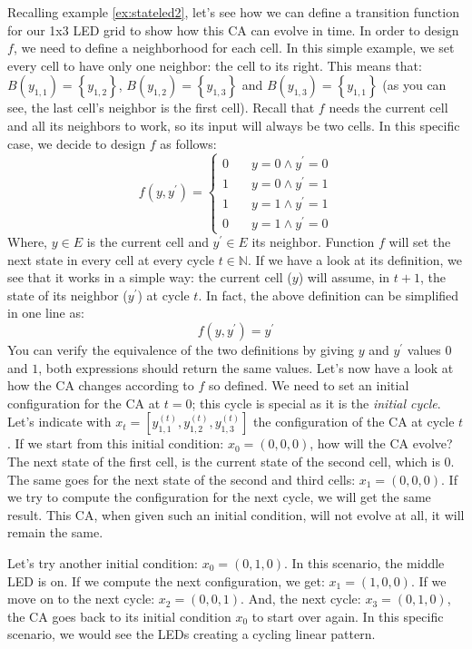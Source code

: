 \begin{example}
\label{ex:stateled3}
Recalling example \ref{ex:stateled2}, let's see how we can define a transition function for our
1x3 LED grid to show how this CA can evolve in time. In order to design $f$, we need to define
a neighborhood for each cell. In this simple example, we set every cell to have only one neighbor:
the cell to its right. This means that: $B\left( y_{1,1} \right) = \left\{ y_{1,2} \right\}$,
$B\left( y_{1,2} \right) = \left\{ y_{1,3} \right\}$ and 
$B\left( y_{1,3} \right) = \left\{ y_{1,1} \right\}$ (as you can see, the last cell's
neighbor is the first cell).
Recall that $f$ needs the current cell
and all its neighbors to work, so its input will always be two cells.
In this specific case, we decide to design $f$ as follows:
\begin{equation*}
f \left( y, y^\prime \right) =
  \begin{cases}
    0       & \quad y = 0 \wedge y^\prime = 0\\
    1       & \quad y = 0 \wedge y^\prime = 1\\
    1       & \quad y = 1 \wedge y^\prime = 1\\
    0       & \quad y = 1 \wedge y^\prime = 0
  \end{cases}
\end{equation*}
Where, $y \in E$ is the current cell and $y^\prime \in E$ its neighbor.
Function $f$ will set the next state in every cell at every cycle $t \in \mathbb{N}$. If we have a look
at its definition, we see that it works in a simple way: the current cell ($y$) will assume, in $t+1$, the state
of its neighbor ($y^\prime$) at cycle $t$. In fact, the above definition can be simplified in one line as:
\begin{equation*}
f \left( y, y^\prime \right) = y^\prime
\end{equation*}
You can verify the equivalence of the two definitions by giving $y$ and $y^\prime$ values $0$ and $1$,
both expressions should return the same values.
Let's now have a look at how the CA changes according to $f$ so defined.
We need to set an initial configuration for the CA at $t=0$; this cycle is special as it is the
\textit{initial cycle}. Let's indicate with 
$x_t = \left[ y^{(t)}_{1,1}, y^{(t)}_{1,2}, y^{(t)}_{1,3} \right]$ the configuration of the CA
at cycle $t$. If we start from this initial condition:
$x_0 = (0,0,0)$, how will the CA evolve? The next state of the first cell, is the current state of the second
cell, which is $0$. The same goes for the next state
of the second and third cells: $x_1 = (0,0,0)$. If we try
to compute the configuration for the next cycle, we will get the same result. This CA, when given
such an initial condition, will not evolve at all, it will remain the same.

Let's try another initial condition: $x_0 = (0,1,0)$. In this scenario, the middle LED is on.
If we compute the next configuration, we get: $x_1 = (1,0,0)$. If we move on to the next cycle:
$x_2 = (0,0,1)$. And, the next cycle: $x_3 = (0,1,0)$, the CA goes back to its initial condition $x_0$
to start over again. In this specific scenario, we would see the LEDs creating a cycling linear pattern.
\end{example}

